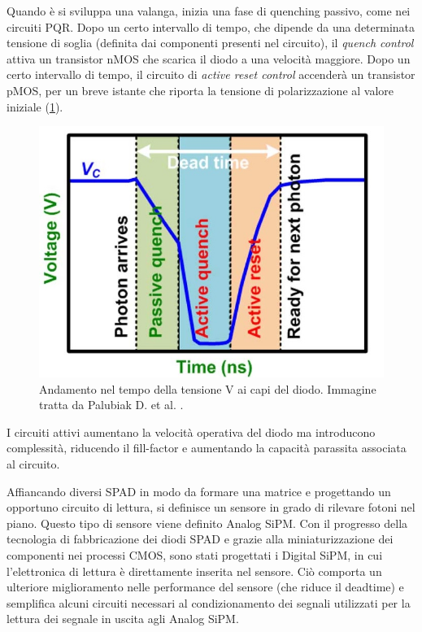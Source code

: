Quando è si sviluppa una valanga, inizia una fase di quenching passivo, come nei circuiti PQR. Dopo un certo intervallo di tempo, che dipende da una determinata tensione di soglia (definita dai componenti presenti nel circuito), il \textit{quench control} attiva un transistor nMOS che scarica il diodo a una velocità maggiore. Dopo un certo intervallo di tempo, il circuito di \textit{active reset control} accenderà un transistor pMOS, per un breve istante che riporta la tensione di polarizzazione al valore iniziale (\Fig\ref{fig:aqr_2}).
\begin{figure}[tbh]
	\centering
	\includegraphics[width=0.5\linewidth]{./ImageFiles/aqr_2.jpg}
	\caption{Andamento nel tempo della tensione V ai capi del diodo. Immagine tratta da Palubiak D. et al. \cite{Palubiak2011}.}
	\label{fig:aqr_2}
\end{figure} 
I circuiti attivi aumentano la velocità operativa del diodo ma introducono complessità, riducendo il fill-factor e aumentando la capacità parassita associata al circuito.
\newpage

Affiancando diversi SPAD in modo da formare una matrice e progettando un opportuno circuito di lettura, si definisce un sensore in grado di rilevare fotoni nel piano. Questo tipo di sensore viene definito Analog SiPM. Con il progresso della tecnologia di fabbricazione dei diodi SPAD e grazie alla miniaturizzazione dei componenti nei processi CMOS, sono stati progettati i Digital SiPM, in cui l'elettronica di lettura è direttamente inserita nel sensore. Ciò comporta un ulteriore miglioramento nelle performance del sensore (che riduce il deadtime) e semplifica alcuni circuiti necessari al condizionamento dei segnali utilizzati per la lettura dei segnale in uscita agli Analog SiPM.

\clearpage
